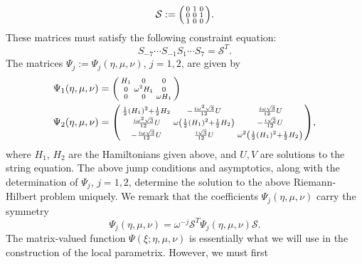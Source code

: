 \documentclass[usenames,dvipsnames]{article}
\theoremstyle{definition}
\numberwithin{equation}{section}
\numberwithin{figure}{section}
\begin{document}
    \begin{equation}
        \mathcal{S} := 
        \begin{psmallmatrix}
                0 & 1 & 0\\
                0 & 0 & 1\\
                1 & 0 & 0
            \end{psmallmatrix}.
    \end{equation}
These matrices must satisfy the following constraint equation:
    \begin{equation}\label{Stokes-Equation}
        S_{-7}\cdots S_{-1}S_{1}\cdots S_{7} = \mathcal{S}^T.
    \end{equation}
The matrices $\Psi_j := \Psi_j(\eta,\mu,\nu)$, $j=1,2$, are given by
    \begin{align}
        \Psi_1(\eta,\mu,\nu) &= 
            \begin{psmallmatrix}
                H_1 & 0 & 0\\
                0 & \omega^2 H_1 & 0\\
                0 & 0 & \omega H_1
            \end{psmallmatrix}\\
        \Psi_2(\eta,\mu,\nu) &=
        \begin{psmallmatrix}
            \frac{1}{2}(H_1)^2+\frac{1}{2}H_2 & -\frac{i\omega^2\sqrt{3}}{12} U & \frac{i\omega\sqrt{3}}{12} U \\
            \frac{i\omega^2\sqrt{3}}{12} U& \omega \left(\frac{1}{2}(H_1)^2+\frac{1}{2}H_2\right) & -\frac{i\sqrt{3}}{12} U\\
            -\frac{i\omega\sqrt{3}}{12}  U &  \frac{i\sqrt{3}}{12} U& \omega^2 \left(\frac{1}{2}(H_1)^2+\frac{1}{2}H_2\right)
        \end{psmallmatrix},
    \end{align}
where $H_1$, $H_2$ are the Hamiltonians given above, and $U,V$ are solutions to the string equation. The above jump conditions and 
asymptotics, along with the determination of $\Psi_j$, $j=1,2$, determine the solution to the above Riemann-Hilbert problem uniquely. We remark that the
coefficients $\Psi_j(\eta,\mu,\nu)$ carry the symmetry
    \begin{equation}
        \Psi_j(\eta,\mu,\nu) = \omega^{-j}\mathcal{S}^T \Psi_j(\eta,\mu,\nu) \mathcal{S}.
    \end{equation}
The matrix-valued function $\Psi(\xi;\eta,\mu,\nu)$ is essentially what we will use in the construction of the local parametrix. However, we must first 
\end{document}
